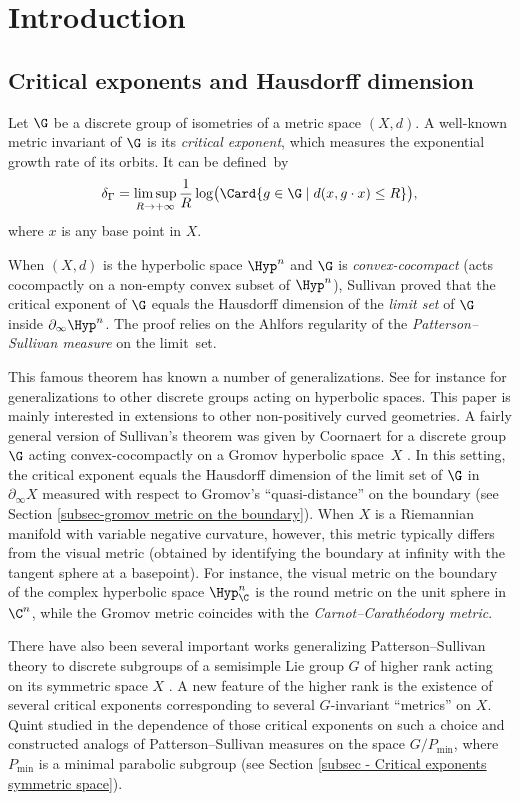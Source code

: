 
\section{Introduction}

\subsection{Critical exponents and Hausdorff dimension}

Let $\G$ be a discrete group of isometries of a metric space $(X,d)$. A well-known metric invariant of $\G$ is its \emph{critical exponent}, which measures the exponential growth rate of its orbits. It can be defined~by
\[\delta_\Gamma = \limsup_{R\to +\infty} \frac{1}{R}\log\bigl(\Card\{g\in \G \mid d(x,g \cdot x) \leq R\}\bigr),\]
where $x$ is any base point in $X$.

When $(X,d)$ is the hyperbolic space $\Hyp^n$ and $\G$ is \emph{convex-cocompact} (\ie acts cocompactly on a non-empty convex subset of $\Hyp^n$), Sullivan \cite{sullivan1979density} proved that the critical exponent of $\G$ equals the Hausdorff dimension of the \emph{limit set} of $\G$ inside $\partial_\infty \Hyp^n$. The proof relies on the Ahlfors regularity of the \emph{Patterson--Sullivan measure} on the limit~set.

This famous theorem has known a number of generalizations. See for instance \cite{DOP,roblin2003ergodicite,Coornaert} for generalizations to other discrete groups acting on hyper\-bolic spaces. This paper is mainly interested in extensions to other non-positively curved geometries. A fairly general version of Sullivan's theorem was given by Coornaert for a discrete group $\G$ acting convex-cocompactly on a Gromov hyperbolic space~$X$ \cite[Cor.\,7.6]{Coornaert}. In this setting, the critical exponent equals the Hausdorff dimension of the limit set of $\G$ in $\partial_\infty X$ measured with respect to Gromov's ``quasi-distance'' on the boundary (see Section \ref{subsec-gromov metric on the boundary}). When $X$ is a Riemannian manifold with variable negative curvature, however, this metric typically differs from the visual metric (obtained by identifying the boundary at infinity with the tangent sphere at a basepoint). For instance, the visual metric on the boundary of the complex hyper\-bolic space $\Hyp^n_\C$ is the round metric on the unit sphere in $\C^n$, while the Gromov metric coincides with the \emph{Carnot--Carathéodory metric}.

There have also been several important works generalizing Patterson--Sullivan theory to discrete subgroups of a semisimple Lie group $G$ of higher rank acting on its symmetric space $X$ \cite{link2005measures,quint2002mesures}. A new feature of the higher rank is the existence of several critical exponents corresponding to several $G$-invariant ``metrics'' on $X$. Quint studied in \cite{quint2002mesures} the dependence of those critical exponents on such a choice and constructed analogs of Patterson--Sullivan measures on the space $G/P_{\min}$, where $P_{\min}$ is a minimal parabolic subgroup (see Section \ref{subsec - Critical exponents symmetric space}).

